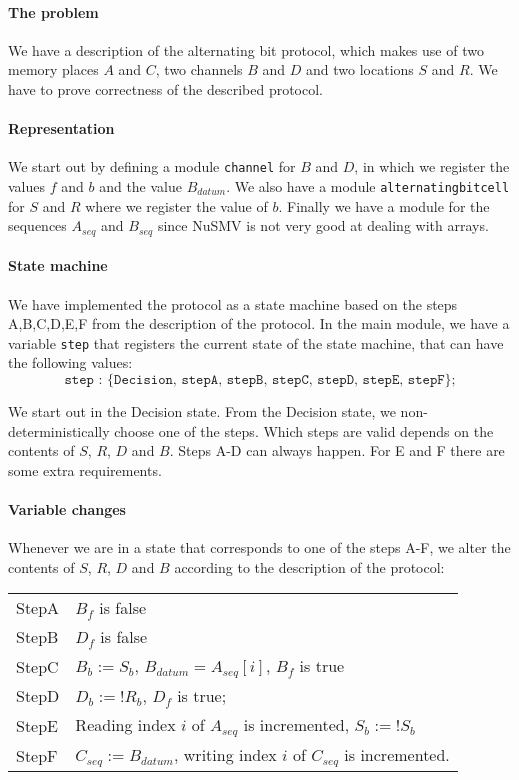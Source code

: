 \documentclass[12pt]{article}
\begin{document}
\paragraph{The problem} We have a description of the alternating bit protocol,
which makes use of two memory places $A$ and $C$, two channels $B$ and $D$ and two locations $S$ and $R$. We have to prove correctness of the described protocol.

\paragraph{Representation} We start out by defining a module \texttt{channel} 
for $B$ and $D$, in which we register the values $f$ and $b$ and the value $B_{datum}$.
We also have a module \texttt{alternatingbitcell} for $S$ and $R$ 
where we register the value of $b$. 
Finally we have a module for the sequences $A_{seq}$ and $B_{seq}$ since NuSMV is not very good at dealing with arrays.

\paragraph{State machine} We have implemented the protocol as a state machine 
based on the steps A,B,C,D,E,F from the description of the protocol. 
In the main module, we have a variable \texttt{step}
that registers the current state of the state machine, 
that can have the following values:
\[ \texttt{step : \{Decision, stepA, stepB, stepC, stepD, stepE, stepF\};}\]

We start out in the Decision state. 
From the Decision state, we non-deterministically choose one of the steps. 
Which steps are valid depends on the contents of $S$, $R$, $D$ and $B$.
Steps A-D can always happen. 
For E and F there are some extra requirements. 

\paragraph{Variable changes}
Whenever we are in a state that corresponds to one of the steps A-F, 
we alter the contents of $S$, $R$, $D$ and $B$ according 
to the description of the protocol:\\

\begin{tabular}{|l|p{12cm}|}
\hline
StepA & $B_f$ is false\\
StepB & $D_f$ is false\\
StepC & $B_b := S_b$, $B_{datum} = A_{seq}[i]$, $B_f$ is true\\
StepD & $D_b := !R_b$, $D_f$ is true; \\
StepE & Reading index $i$ of $A_{seq}$ is incremented, $S_b := !S_b$\\
StepF & $C_{seq} := B_{datum}$, writing index $i$ of $C_{seq}$ is incremented.\\
\hline
\end{tabular}
\end{document}
